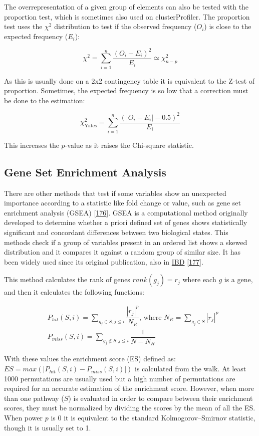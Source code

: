 \documentclass[
  12pt,
  a4paper,
  twoside,
  openright]{book}
\begin{document}
The overrepresentation of a given group of elements can also be tested with the proportion test, which is sometimes also used on clusterProfiler.
The proportion test uses the \(\chi^2\) distribution to test if the observed frequency (\(O_i\)) is close to the expected frequency (\(E_i\)):

\[
\chi^2 = \sum_{i =1}^n \dfrac{(O_i - E_i)^2}{E_i} \simeq \chi_{n-p}^2
\]

As this is usually done on a 2x2 contingency table it is equivalent to the Z-test of proportion.
Sometimes, the expected frequency is so low that a correction must be done to the estimation:

\[
\chi_{\text{Yates}}^2 = \sum_{i =1}^n \dfrac{(|O_i - E_i | - 0.5)^2}{E_i}
\]

This increases the \(p\)-value as it raises the Chi-square statistic.

\hypertarget{gene-set-enrichment-analysis}{%
\subsection{Gene Set Enrichment Analysis}\label{gene-set-enrichment-analysis}}

There are other methods that test if some variables show an unexpected importance according to a statistic like fold change or value, such as gene set enrichment analysis (GSEA) {[}\protect\hyperlink{ref-subramanian2005}{176}{]}.
GSEA is a computational method originally developed to determine whether a priori defined set of genes shows statistically significant and concordant differences between two biological states.
This methods check if a group of variables present in an ordered list shows a skewed distribution and it compares it against a random group of similar size.
It has been widely used since its original publication, also in \protect\hyperlink{acronyms_IBD}{IBD} {[}\protect\hyperlink{ref-protiva2016}{177}{]}.

This method calculates the rank of genes \(rank(g_j)=r_j\) where each \(g\) is a gene, and then it calculates the following functions:

\[
\begin{aligned}
& P_{hit}(S, i) = \sum_{g_j \in S, j \leq i}\dfrac{|r_j|^p}{N_R} \text{, where } N_R = \sum_{g_j \in S}|r_j|^p \\
& P_{miss}(S, i) = \sum_{g_j \not \in S, j \leq i}\dfrac{1}{N - N_H}
\end{aligned}
\]

With these values the enrichment score (ES) defined as: \(ES=max(|P_{hit}(S, i)-P_{miss}(S, i)\vert)\) is calculated from the walk.
At least 1000 permutations are usually used but a high number of permutations are required for an accurate estimation of the enrichment score.
However, when more than one pathway (\(S\)) is evaluated in order to compare between their enrichment scores, they must be normalized by dividing the scores by the mean of all the ES.
When power \(p\) is 0 it is equivalent to the standard Kolmogorov--Smirnov statistic, though it is usually set to 1.
\end{document}
